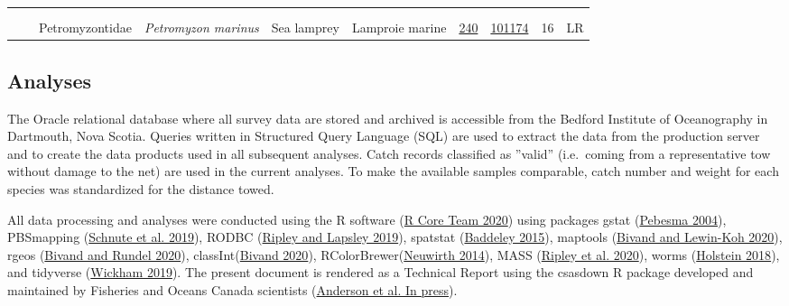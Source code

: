\documentclass[12pt]{article}\usepackage[]{graphicx}\usepackage[]{color}
\begin{document}
\begin{landscapepage}
\begin{longtable}[t]{ccc>{\centering\arraybackslash}p{3cm}>{\centering\arraybackslash}p{3cm}>{\centering\arraybackslash}p{3cm}>{}c>{}ccc}
\addlinespace[0.3em]
\\
\addlinespace[0.3em]
\\
\hspace{1em}\hspace{1em} &  & Petromyzontidae & \em{Petromyzon marinus} & Sea lamprey & Lamproie marine & \href{#sec:2550}{240} & \href{http://www.marinespecies.org/aphia.php?p=taxdetails&id=156134}{101174} & 16 & LR\\*
\end{longtable}
\endgroup{}
\end{landscapepage}
\hypertarget{analyses}{%
\subsection{Analyses}\label{analyses}}

The Oracle relational database where all survey data are stored and archived is accessible from the Bedford Institute of Oceanography in Dartmouth, Nova Scotia. Queries written in Structured Query Language (SQL) are used to extract the data from the production server and to create the data products used in all subsequent analyses. Catch records classified as ''valid'' (i.e.~coming from a representative tow without damage to the net) are used in the current analyses. To make the available samples comparable, catch number and weight for each species was standardized for the distance towed.

All data processing and analyses were conducted using the R software (\protect\hyperlink{ref-R:2020}{R Core Team 2020}) using packages gstat (\protect\hyperlink{ref-R:package:gstat}{Pebesma 2004}), PBSmapping (\protect\hyperlink{ref-R:package:PBSmapping}{Schnute et al. 2019}), RODBC (\protect\hyperlink{ref-R:package:RODBC}{Ripley and Lapsley 2019}), spatstat (\protect\hyperlink{ref-R:package:spatstat}{Baddeley 2015}), maptools (\protect\hyperlink{ref-R:package:maptools}{Bivand and Lewin-Koh 2020}), rgeos (\protect\hyperlink{ref-R:package:rgeos}{Bivand and Rundel 2020}), classInt(\protect\hyperlink{ref-R:package:classInt}{Bivand 2020}), RColorBrewer(\protect\hyperlink{ref-R:package:RColorBrewer}{Neuwirth 2014}), MASS (\protect\hyperlink{ref-R:package:MASS}{Ripley et al. 2020}), worms (\protect\hyperlink{ref-R:package:worms}{Holstein 2018}), and tidyverse (\protect\hyperlink{ref-R:Tidyverse}{Wickham 2019}). The present document is rendered as a Technical Report using the csasdown R package developed and maintained by Fisheries and Oceans Canada scientists (\protect\hyperlink{ref-R:csasdown}{Anderson et al. In press}).
\end{document}
